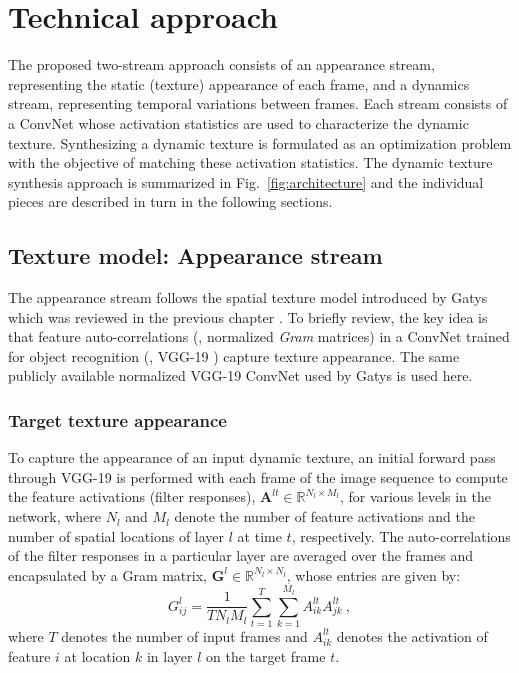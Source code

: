 \chapter{Technical approach}

The proposed two-stream approach consists of an appearance
stream, representing the static (texture) appearance of each frame,
and a dynamics stream, representing temporal 
variations between frames.
Each stream consists of a ConvNet whose activation 
statistics are used to characterize the dynamic texture.
Synthesizing a dynamic texture is formulated as an optimization 
problem with the objective of matching these activation 
statistics.
The dynamic texture synthesis approach is summarized in Fig.\ \ref{fig:architecture}
and the individual pieces are described in turn in the
following sections.



\section{Texture model: Appearance stream}

The appearance stream follows the spatial texture model
introduced by Gatys \etal \cite{gatys2015} which was reviewed in the previous chapter .
To briefly review, the key idea is that feature auto-correlations (\ie, normalized \emph{Gram} matrices) in a 
ConvNet trained for 
object recognition (\eg, VGG-19 \cite{simonyan2014very}) 
capture texture appearance.
The same publicly available normalized VGG-19 ConvNet \cite{simonyan2014very} used by Gatys \etal \cite{gatys2015} is used here.

\subsection{Target texture appearance}

To capture the appearance of an input dynamic texture, an initial forward pass through VGG-19 is performed with each frame of the image sequence to compute the feature activations (filter responses),
$\mathbf{A}^{lt} \in \mathbb{R}^{N_l\times M_l}$, for various
levels in the network, where $N_l$ and $M_l$ denote
the number of feature activations and the number of spatial locations of layer
$l$ at time $t$, respectively.
The auto-correlations of the filter responses in a particular layer are
averaged over the frames and encapsulated by a Gram matrix,
$\mathbf{G}^{l} \in \mathbb{R}^{N_l \times N_l}$, whose
entries are given by:
\begin{equation}
	G_{ij}^l = \frac{1}{T N_l M_l} \sum_{t=1}^T \sum_{k=1}^{M_l} A_{ik}^{lt} A_{jk}^{lt}\ ,
	\label{eq:gram_target}
\end{equation}
where $T$ denotes the number of input frames
and $A_{ik}^{lt}$ denotes the activation of feature $i$ at
location $k$ in layer $l$ on the target frame $t$.

